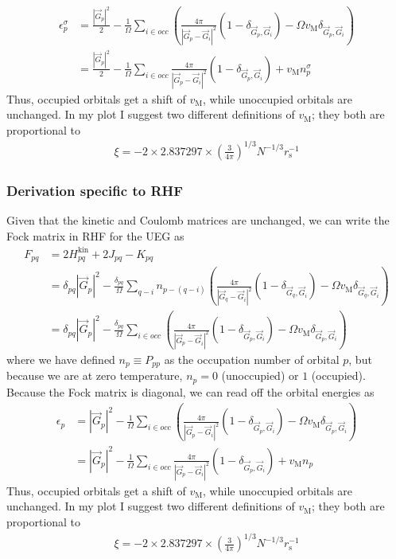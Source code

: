\begin{align}
\epsilon_{ p}^\sigma & = \frac{|\vec{G}_p|^2}{2} -\frac{1}{\Omega} \sum_{i\in occ} \left(\frac{4 \pi}{\left|\vec{G}_p-\vec{G}_i\right|^2} \left(1-\delta_{\vec{G}_p,\vec{G}_i}\right) - \Omega v_{\mathrm{M}}\delta_{\vec{G}_p,\vec{G}_i}\right) \\
& = \frac{|\vec{G}_p|^2}{2} -\frac{1}{\Omega} \sum_{i\in occ} \frac{4 \pi }{\left|\vec{G}_p-\vec{G}_i\right|^2} \left(1-\delta_{\vec{G}_p,\vec{G}_i}\right) + v_{\mathrm{M}}n^\sigma_{p}
\end{align}
Thus, occupied orbitals get a shift of $v_{\mathrm{M}}$, while unoccupied orbitals are unchanged. In my plot I suggest two different definitions of $v_{\mathrm{M}}$; they both are proportional to 
\begin{align}
    \xi = -2 \times 2.837297 \times\left(\frac{3}{4 \pi}\right)^{1 / 3} N^{-1 / 3} r_{\mathrm{s}}^{-1}
\end{align}
\subsubsection{Derivation specific to RHF}
Given that the kinetic and Coulomb matrices are unchanged, we can write the Fock matrix in RHF for the UEG as
\begin{align}
F_{ p q} & = 2H_{ p q}^{\mathrm{kin}} + 2J_{ p q} - K_{ p q} \\
& = \delta_{ p q} |\vec{G}_p|^2 -\frac{\delta_{pq}}{\Omega} \sum_{q-i} n_{p-(q-i)} \left(\frac{4 \pi}{\left|\vec{G}_q-\vec{G}_i\right|^2} \left(1-\delta_{\vec{G}_q,\vec{G}_i}\right) - \Omega v_{\mathrm{M}}\delta_{\vec{G}_q,\vec{G}_i}\right) \\
& = \delta_{ p q} |\vec{G}_p|^2 -\frac{\delta_{pq}}{\Omega} \sum_{i\in occ} \left(\frac{4 \pi}{\left|\vec{G}_p-\vec{G}_i\right|^2} \left(1-\delta_{\vec{G}_p,\vec{G}_i}\right) - \Omega v_{\mathrm{M}}\delta_{\vec{G}_p,\vec{G}_i}\right) 
\end{align}
where we have defined $n_{p} \equiv P_{pp}$ as the occupation number of orbital $p$, but because we are at zero temperature, $n_{p}=0$ (unoccupied) or $1$ (occupied). Because the Fock matrix is diagonal, we can read off the orbital energies as
\begin{align}
\epsilon_{ p} & = |\vec{G}_p|^2 -\frac{1}{\Omega} \sum_{i\in occ} \left(\frac{4 \pi}{\left|\vec{G}_p-\vec{G}_i\right|^2} \left(1-\delta_{\vec{G}_p,\vec{G}_i}\right) - \Omega v_{\mathrm{M}}\delta_{\vec{G}_p,\vec{G}_i}\right) \\
& = |\vec{G}_p|^2 -\frac{1}{\Omega} \sum_{i\in occ} \frac{4 \pi }{\left|\vec{G}_p-\vec{G}_i\right|^2} \left(1-\delta_{\vec{G}_p,\vec{G}_i}\right) + v_{\mathrm{M}}n_{p}
\end{align}
Thus, occupied orbitals get a shift of $v_{\mathrm{M}}$, while unoccupied orbitals are unchanged. In my plot I suggest two different definitions of $v_{\mathrm{M}}$; they both are proportional to 
\begin{align}
    \xi = -2 \times 2.837297 \times\left(\frac{3}{4 \pi}\right)^{1 / 3} N^{-1 / 3} r_{\mathrm{s}}^{-1}
\end{align}

